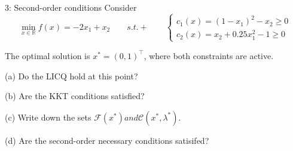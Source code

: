 
\begin{problem}{3: Second-order conditions}
Consider
\[
  \min_{x \in \mathbb{R}} f(x) = -2x_1 + x_2 \qquad s.t. +\qquad 
  \left\{
    \begin{aligned}
      c_1(x) = (1-x_1)^2 - x_2 \geq 0 \\
      c_2(x) = x_2 + 0.25x_1^2 - 1 \geq 0
    \end{aligned}
    \right
.\] 

The optimal solution is $x^{*} = (0, 1)^{\top}$, where both constraints are active. 

\medskip

(a) Do the LICQ hold at this point?

\medskip

(b) Are the KKT conditions satisfied?

\medskip

(c) Write down the sets $\mathcal{F}(x^{*}) and \mathcal{C}(x^{*}, \lambda^{*})$.

\medskip

(d) Are the second-order necessary conditions satisifed?


\end{problem}


